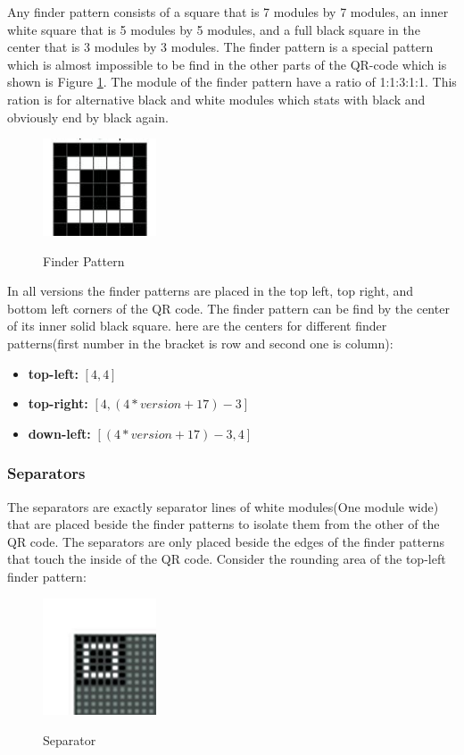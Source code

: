  Any finder pattern consists of a square that is 7 modules by 7 modules, an inner white square that is 5 modules by 5 modules, and a full black square in the center that is 3 modules by 3 modules. The finder pattern is a special pattern which is almost impossible to be find in the other parts of the QR-code which is shown is Figure \ref{fig:23}. The module of the finder pattern have a ratio of 1:1:3:1:1. This ration is for alternative black and white modules which stats with black and obviously end by black again.
 
 \begin{figure}[H]
  \caption{Finder Pattern}
  \centering
    \includegraphics[width=0.3\textwidth]{figures/Finderpattern.jpg}
    \label{fig:23}
\end{figure}

In all versions the finder patterns are placed in the top left, top right, and bottom left corners of the QR code. The finder pattern can be find by the center of its inner solid black square. here are the centers for different finder patterns(first number in the bracket is row and second one is column):

\begin{itemize}
\item \textbf{top-left:} $[4,4]$
\item \textbf{top-right:} $[4,(4*version+17)-3]$
\item \textbf{down-left:} $[(4*version+17)-3,4]$
\end{itemize}

\subsubsection{Separators}

The separators are exactly separator lines of white modules(One module wide) that are placed beside the finder patterns to isolate them from the other of the QR code. The separators are only placed beside the edges of the finder patterns that touch the inside of the QR code. Consider the rounding area of the top-left finder pattern: 
\begin{figure}[H]
  \caption{Separator}
  \centering
    \includegraphics[width=0.3\textwidth]{figures/Separator.jpg}
    \label{fig:24}
\end{figure}


